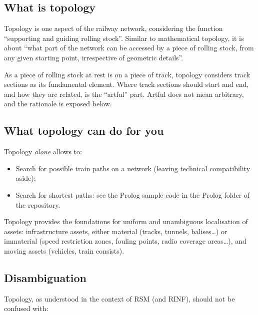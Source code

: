 \documentclass[
  11pt,
]{article}
\providecommand{\tightlist}{%
  \setlength{\itemsep}{0pt}\setlength{\parskip}{0pt}}
\begin{document}
\hypertarget{what-is-topology}{%
\subsection{What is topology}\label{what-is-topology}}

Topology is one aspect of the railway network, considering the function
``supporting and guiding rolling stock''. Similar to mathematical
topology, it is about ``what part of the network can be accessed by a
piece of rolling stock, from any given starting point, irrespective of
geometric details''.

As a piece of rolling stock at rest is on a piece of track, topology
considers track sections as its fundamental element. Where track
sections should start and end, and how they are related, is the
``artful'' part. Artful does not mean arbitrary, and the rationale is
exposed below.

\hypertarget{what-topology-can-do-for-you}{%
\subsection{What topology can do for
you}\label{what-topology-can-do-for-you}}

Topology \emph{alone} allows to:

\begin{itemize}
\tightlist
\item
  Search for possible train paths on a network (leaving technical
  compatibility aside);
\item
  Search for shortest paths: see the Prolog sample code in the Prolog
  folder of the repository.
\end{itemize}

Topology provides the foundations for uniform and unambiguous
localisation of assets: infrastructure assets, either material (tracks,
tunnels, balises\ldots) or immaterial (speed restriction zones, fouling
points, radio coverage areas\ldots), and moving assets (vehicles, train
consists).

\hypertarget{disambiguation}{%
\subsection{Disambiguation}\label{disambiguation}}

Topology, as understood in the context of RSM (and RINF), should not be
confused with:
\end{document}

